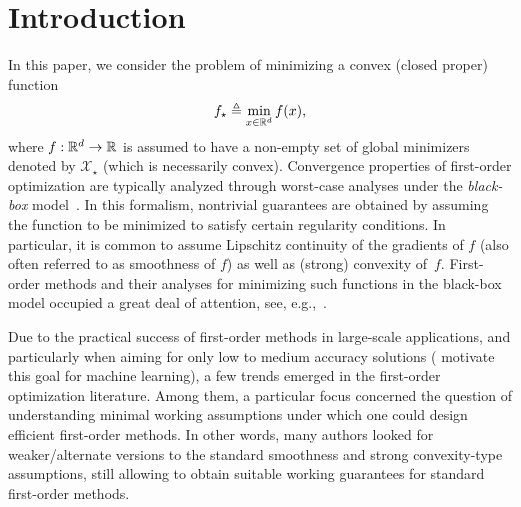\section{Introduction}\label{sec:introduction}
In this paper, we consider the problem of minimizing a convex (closed proper) function
\begin{equation}\label{eq:opt}
f_{\star}\triangleq\min_{x\in \mathbb{R} ^d} f(x),
\end{equation}
where $f: \mathbb{R}^d \to \mathbb{R}$ is assumed to have a non-empty set of global minimizers denoted by $\mathcal{X}_\star$ (which is necessarily convex). Convergence properties of first-order optimization are typically analyzed through worst-case analyses under the \emph{black-box} model~\citep{Book:NemirovskyYudin}. In this formalism, nontrivial guarantees are obtained by assuming the function to be minimized to satisfy certain regularity conditions. In particular, it is common to assume Lipschitz continuity of the gradients of $f$ (also often referred to as smoothness of $f$) as well as (strong) convexity of~$f$. First-order methods and their analyses for minimizing such functions in the black-box model occupied a great deal of attention, see, e.g.,~\citep{Book:NemirovskyYudin,Book:polyak1987,Nest03a}.

Due to the practical success of first-order methods in large-scale applications, and particularly when aiming for only low to medium accuracy solutions (\citet{bottou2007tradeoffs} motivate this goal for machine learning), a few trends emerged in the first-order optimization literature. Among them, a particular focus concerned the question of understanding minimal working assumptions under which one could design efficient first-order methods. In other words, many authors looked for weaker/alternate versions to the standard smoothness and strong convexity-type assumptions, still allowing to obtain suitable working guarantees for standard first-order methods.

